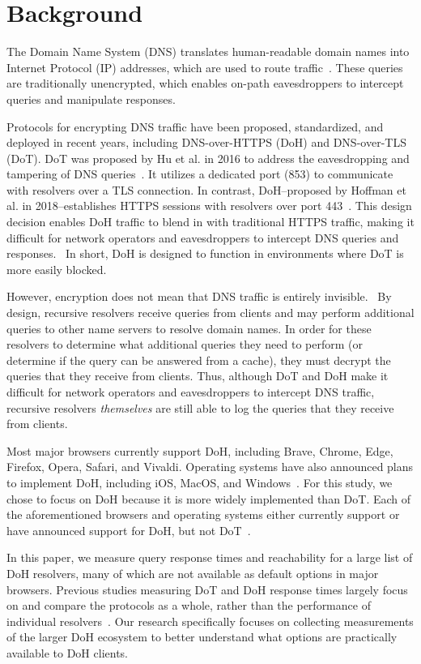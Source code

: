 \section{Background}\label{sec:back}
The Domain Name System (DNS) translates human-readable domain names into Internet Protocol (IP) addresses, which are used to route traffic~\cite{dns-rfcs}.
These queries are traditionally unencrypted, which enables on-path eavesdroppers to intercept queries and manipulate responses.

Protocols for encrypting DNS traffic have been proposed, standardized, and deployed in recent years, including DNS-over-HTTPS (DoH) and DNS-over-TLS (DoT).
DoT was proposed by Hu et al. in 2016 to address the eavesdropping and tampering of DNS queries~\cite{hu2016DoT}.
It utilizes a dedicated port (853) to communicate with resolvers over a TLS connection.
In contrast, DoH--proposed by Hoffman et al. in 2018--establishes HTTPS sessions with resolvers over port 443~\cite{hoffman2018DoH}.
This design decision enables DoH traffic to blend in with traditional HTTPS traffic, making it difficult for network operators and eavesdroppers to intercept DNS queries and responses.~\cite{boettger2019empirical}
In short, DoH is designed to function in environments where DoT is more easily blocked.

However, encryption does not mean that DNS traffic is entirely invisible.~\cite{IEEEfight}
By design, recursive resolvers receive queries from clients and may perform additional queries to other name servers to resolve domain names.
In order for these resolvers to determine what additional queries they need to perform (or determine if the query can be answered from a cache), they must decrypt the queries that they receive from clients.
Thus, although DoT and DoH make it difficult for network operators and eavesdroppers to intercept DNS traffic, recursive resolvers \emph{themselves} are still able to log the queries that they receive from clients.

Most major browsers currently support DoH, including Brave, Chrome, Edge, Firefox, Opera, Safari, and Vivaldi.
Operating systems have also announced plans to implement DoH, including iOS, MacOS, and Windows~\cite{ffSettings,operaEdgeSettings,vivaldiSettings,iosSettings,jensen2020windows}.
For this study, we chose to focus on DoH because it is more widely implemented than DoT.
Each of the aforementioned browsers and operating systems either currently support or have announced support for DoH, but not DoT~\cite{lack-of-dot-support}.

In this paper, we measure query response times and reachability for a large list of DoH resolvers, many of which are not available as default options in major browsers.
Previous studies measuring DoT and DoH response times largely focus on and compare the protocols as a whole, rather than the performance of individual resolvers~\cite{lu2019end-to-end}.
Our research specifically focuses on collecting measurements of the larger DoH ecosystem to better understand what options are practically available to DoH clients.


